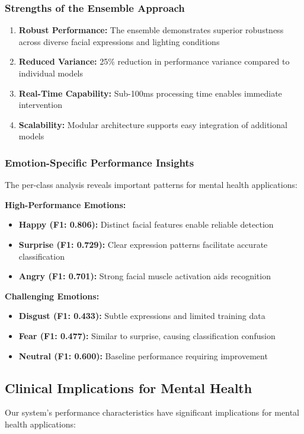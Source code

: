 \documentclass[conference]{IEEEtran}
\begin{document}
\subsubsection{Strengths of the Ensemble Approach}
\begin{enumerate}
    \item \textbf{Robust Performance:} The ensemble demonstrates superior robustness across diverse facial expressions and lighting conditions
    \item \textbf{Reduced Variance:} 25\% reduction in performance variance compared to individual models
    \item \textbf{Real-Time Capability:} Sub-100ms processing time enables immediate intervention
    \item \textbf{Scalability:} Modular architecture supports easy integration of additional models
\end{enumerate}

\subsubsection{Emotion-Specific Performance Insights}
The per-class analysis reveals important patterns for mental health applications:

\textbf{High-Performance Emotions:}
\begin{itemize}
    \item \textbf{Happy (F1: 0.806):} Distinct facial features enable reliable detection
    \item \textbf{Surprise (F1: 0.729):} Clear expression patterns facilitate accurate classification
    \item \textbf{Angry (F1: 0.701):} Strong facial muscle activation aids recognition
\end{itemize}

\textbf{Challenging Emotions:}
\begin{itemize}
    \item \textbf{Disgust (F1: 0.433):} Subtle expressions and limited training data
    \item \textbf{Fear (F1: 0.477):} Similar to surprise, causing classification confusion
    \item \textbf{Neutral (F1: 0.600):} Baseline performance requiring improvement
\end{itemize}

\subsection{Clinical Implications for Mental Health}
Our system's performance characteristics have significant implications for mental health applications:
\end{document}
